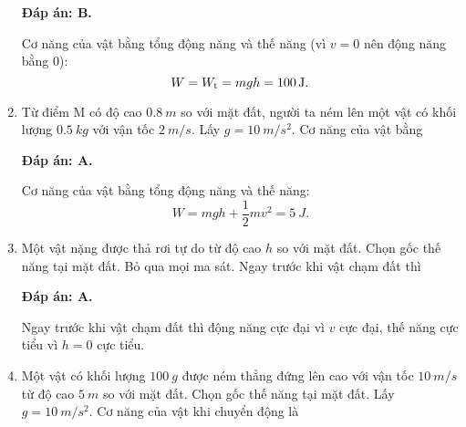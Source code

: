 \begin{enumerate}[label=\bfseries Câu \arabic*:, leftmargin=1.5cm]
	\hideall
	{	
		\textbf{Đáp án: B.}
		
		Cơ năng của vật bằng tổng động năng và thế năng (vì $v=0$ nên động năng bằng 0):
		$$W=W_\text t = mgh = \SI{100}{J}.$$
	}
	\item {}
	
	
	{
		Từ điểm M có độ cao $\SI{0.8}{m}$ so với mặt đất, người ta ném lên một vật có khối lượng $\SI{0.5}{kg}$ với vận tốc $\SI{2}{m/s}$. Lấy $g=\SI{10}{m/s^2}$. Cơ năng của vật bằng
	}
	
	\hideall
	{	
		\textbf{Đáp án: A.}
		
		Cơ năng của vật bằng tổng động năng và thế năng:
		$$W=mgh + \dfrac{1}{2}mv^2 = \SI{5}{J}.$$
	}
	\item {}
	
	
	{
		Một vật nặng được thả rơi tự do từ độ cao $h$ so với mặt đất. Chọn gốc thế năng tại mặt đất. Bỏ qua mọi ma sát. Ngay trước khi vật chạm đất thì
	}
	
	\hideall
	{	
		\textbf{Đáp án: A.}
		
		Ngay trước khi vật chạm đất thì động năng cực đại vì $v$ cực đại, thế năng cực tiểu vì $h=0$ cực tiểu.
	}
	\item {}
	
	
	{
		Một vật có khối lượng $\SI{100}{g}$ được ném thẳng đứng lên cao với vận tốc $\SI{10}{m/s}$ từ độ cao $\SI{5}{m}$ so với mặt đất. Chọn gốc thế năng tại mặt đất. Lấy $g=\SI{10}{m/s^2}$. Cơ năng của vật khi chuyển động là
	}
	

\end{enumerate}
